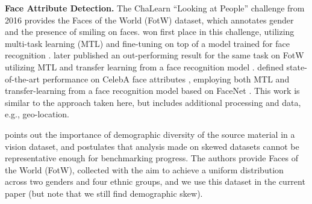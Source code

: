 \documentclass{article}
\begin{document}
{\bf Face Attribute Detection.} The ChaLearn  ``Looking at People'' challenge from 2016 \cite{escaleraetal2017chalearn} provides the Faces of the World (FotW) dataset, which annotates gender and the presence of smiling on faces. \cite{zhangetal2016gendersmile} won first place in this challenge, utilizing multi-task learning (MTL) and fine-tuning on top of a model trained for face recognition \cite{parkhi2015face}. \cite{ranjan2017smilingbestfotw} later published an out-performing result for the same task on FotW utilizing MTL and transfer learning from a face recognition model \cite{sankar2017face}.
\cite{walkandlearn2016} defined state-of-the-art performance on CelebA face attributes \cite{liuetal2015celeba}, employing both MTL and transfer-learning from a face recognition model based on FaceNet \cite{facenet2016}. This work is similar to the approach taken here, but includes additional processing and data, e.g., geo-location.




\cite{escaleraetal2017chalearn} points out the importance of demographic diversity of
the source material in a vision dataset, and postulates that analysis made on
skewed datasets cannot be representative enough for benchmarking progress.  The authors provide Faces of the World (FotW), collected with the aim to achieve a uniform distribution across two genders and four ethnic groups, and we use this dataset in the current paper (but note that we still find demographic skew).
\end{document}
